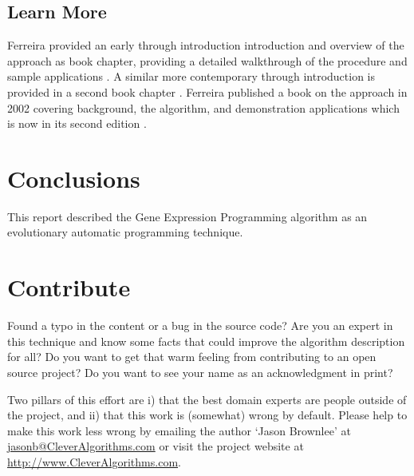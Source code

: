 \documentclass[a4paper, 11pt]{article}
\makeatletter
\newcommand{\myreportauthor}{Jason Brownlee}
\newcommand{\myreportemail}{jasonb@CleverAlgorithms.com}
\newcommand{\myreportwebsite}{http://www.CleverAlgorithms.com}
\makeatother
\begin{document}
% 
% 
\subsection{Learn More}
Ferreira provided an early through introduction introduction and overview of the approach as book chapter, providing a detailed walkthrough of the procedure and sample applications \cite{Ferreira2002}. A similar more contemporary through introduction is provided in a second book chapter \cite{Ferreira2005}.
Ferreira published a book on the approach in 2002 covering background, the algorithm, and demonstration applications which is now in its second edition \cite{Ferreira2006}.


% 
% 
\section{Conclusions}
\label{sec:conclusions}
This report described the Gene Expression Programming algorithm as an evolutionary automatic programming technique.

% 
% 
\section{Contribute}
\label{sec:contribute}
Found a typo in the content or a bug in the source code? 
Are you an expert in this technique and know some facts that could improve the algorithm description for all?
Do you want to get that warm feeling from contributing to an open source project? 
Do you want to see your name as an acknowledgment in print?

Two pillars of this effort are i) that the best domain experts are people outside of the project, and ii) that this work is (somewhat) wrong by default. 
Please help to make this work less wrong by emailing the author `\myreportauthor' at \url{\myreportemail} or visit the project website at \url{\myreportwebsite}.



\end{document}
